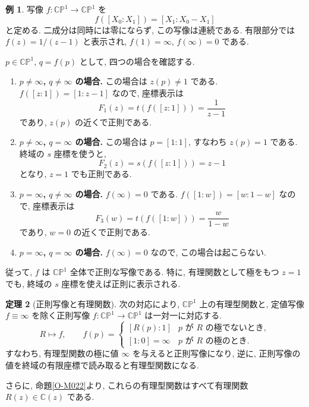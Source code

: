 \documentclass[dvipdfmx,a4paper,11pt]{article} %
\newcommand{\C}{\mathbb{C}}
\theoremstyle{definition}
\newtheorem{thm}{定理}[section]
\numberwithin{equation}{section}
\newtheorem{exa}[thm]{例}
\begin{document}
\begin{exa}
写像 $f:\C\mathbb P^1\to\C\mathbb P^1$ を
\[
f([X_0:X_1])=[X_1:X_0-X_1]
\]
と定める.
二成分は同時には零にならず, この写像は連続である.
有限部分では $f(z)=1/(z-1)$ と表示され,
$f(1)=\infty$, $f(\infty)=0$ である.

$p\in\C\mathbb P^1$, $q=f(p)$ として,
四つの場合を確認する.

\begin{enumerate}
\item
\textbf{$p\neq\infty$, $q\neq\infty$ の場合.}
この場合は $z(p)\neq1$ である.
$f([z:1])=[1:z-1]$ なので, 座標表示は
\[
F_1(z)=t(f([z:1]))=\frac1{z-1}
\]
であり, $z(p)$ の近くで正則である.

\item
\textbf{$p\neq\infty$, $q=\infty$ の場合.}
この場合は $p=[1:1]$, すなわち $z(p)=1$ である.
終域の $s$ 座標を使うと,
\[
F_2(z)=s(f([z:1]))=z-1
\]
となり, $z=1$ でも正則である.

\item
\textbf{$p=\infty$, $q\neq\infty$ の場合.}
$f(\infty)=0$ である.
$f([1:w])=[w:1-w]$ なので, 座標表示は
\[
F_3(w)=t(f([1:w]))=\frac{w}{1-w}
\]
であり, $w=0$ の近くで正則である.

\item
\textbf{$p=\infty$, $q=\infty$ の場合.}
$f(\infty)=0$ なので, この場合は起こらない.
\end{enumerate}

従って, $f$ は $\C\mathbb P^1$ 全体で正則な写像である.
特に, 有理関数として極をもつ $z=1$ でも,
終域の $s$ 座標を使えば正則に表示される.
\end{exa}

\begin{thm}[正則写像と有理関数]
次の対応により, $\C\mathbb P^1$ 上の有理型関数と,
定値写像 $f\equiv\infty$ を除く正則写像
$f:\C\mathbb P^1\to\C\mathbb P^1$ は一対一に対応する.
\[
R\longmapsto f,\qquad
f(p)=
\begin{cases}
[R(p):1] & p\text{ が }R\text{ の極でないとき},\\
[1:0]=\infty & p\text{ が }R\text{ の極のとき}.
\end{cases}
\]
すなわち, 有理型関数の極に値 $\infty$ を与えると正則写像になり,
逆に, 正則写像の値を終域の有限座標で読み取ると有理型関数になる.

さらに, 命題\ref{O-M022}より,
これらの有理型関数はすべて有理関数 $R(z)\in\C(z)$ である.
\end{thm}
\end{document}
